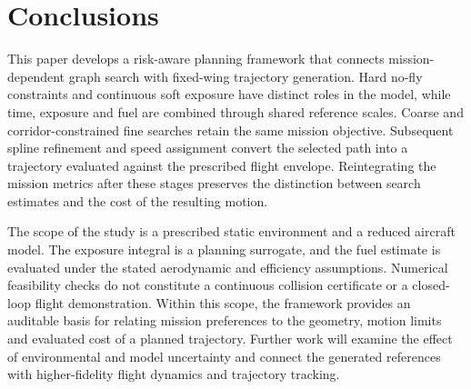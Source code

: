 \section{Conclusions}
\label{sec:conclusions}

This paper develops a risk-aware planning framework that connects
mission-dependent graph search with fixed-wing trajectory generation.
Hard no-fly constraints and continuous soft exposure have distinct roles
in the model, while time, exposure and fuel are combined through shared
reference scales. Coarse and corridor-constrained fine searches retain
the same mission objective. Subsequent spline refinement and speed
assignment convert the selected path into a trajectory evaluated against
the prescribed flight envelope. Reintegrating the mission metrics after
these stages preserves the distinction between search estimates and the
cost of the resulting motion.


The scope of the study is a prescribed static environment and a reduced
aircraft model. The exposure integral is a planning surrogate, and the
fuel estimate is evaluated under the stated aerodynamic and efficiency
assumptions. Numerical feasibility checks do not constitute a continuous
collision certificate or a closed-loop flight demonstration. Within this
scope, the framework provides an auditable basis for relating mission
preferences to the geometry, motion limits and evaluated cost of a planned
trajectory. Further work will examine the effect of environmental and
model uncertainty and connect the generated references with higher-fidelity
flight dynamics and trajectory tracking.
